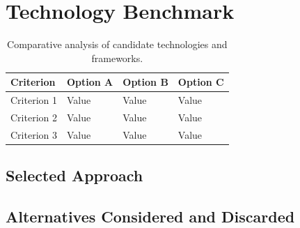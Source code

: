 \section{Technology Benchmark}

\lipsum[1]

\begin{table}[H]
	\centering
	\caption{Comparative analysis of candidate technologies and frameworks.}
	\label{tab:benchmark}
	\begin{tabular}{|p{3cm}|p{3cm}|p{3cm}|p{3cm}|}
		\hline
		\textbf{Criterion} & \textbf{Option A} & \textbf{Option B} & \textbf{Option C} \\
		\hline
		Criterion 1 & Value & Value & Value \\
		\hline
		Criterion 2 & Value & Value & Value \\
		\hline
		Criterion 3 & Value & Value & Value \\
		\hline
	\end{tabular}
\end{table}

\subsection{Selected Approach}

\lipsum[2]

\subsection{Alternatives Considered and Discarded}

\lipsum[3]
